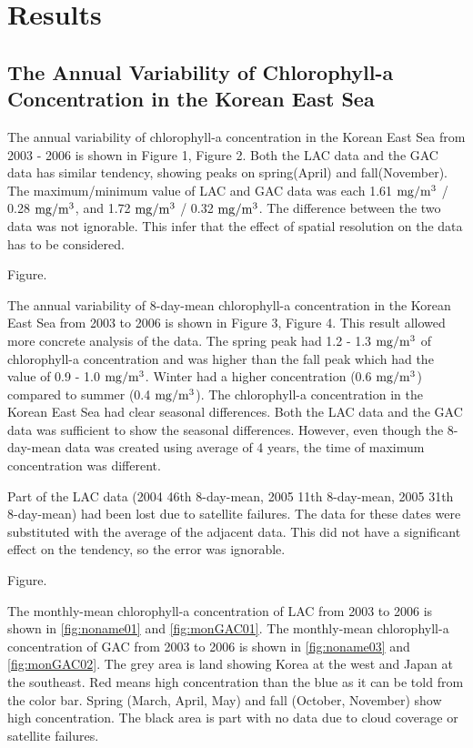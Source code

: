 
\section{Results}
 
\subsection{The Annual Variability of Chlorophyll-a Concentration in the Korean East Sea}
 
The annual variability of chlorophyll-a concentration in the Korean East Sea from 2003 - 2006 is shown in Figure 1, Figure 2. Both the LAC data and the GAC data has similar tendency, showing peaks on spring(April) and fall(November). The maximum/minimum value of LAC and GAC data was each 1.61 $\rm mg/m^3$ / 0.28 $\rm mg/m^3$, and 1.72 $\rm mg/m^3$ / 0.32 $\rm mg/m^3$. The difference between the two data was not ignorable. This infer that the effect of spatial resolution on the data has to be considered.
  
 Figure.
 
The annual variability of 8-day-mean chlorophyll-a concentration in the Korean East Sea from 2003 to 2006 is shown in Figure 3, Figure 4. This result allowed more concrete analysis of the data. The spring peak had 1.2 - 1.3 $\rm mg/m^3$ of chlorophyll-a concentration and was higher than the fall peak which had the value of 0.9 - 1.0 $\rm mg/m^3$. Winter had a higher concentration (0.6 $\rm mg/m^3$) compared to summer (0.4 $\rm mg/m^3$). The chlorophyll-a concentration in the Korean East Sea had clear seasonal differences. Both the LAC data and the GAC data was sufficient to show the seasonal differences. However, even though the 8-day-mean data was created using average of 4 years, the time of maximum concentration was different. 

Part of the LAC data (2004 46th 8-day-mean, 2005 11th 8-day-mean, 2005 31th 8-day-mean) had been lost due to satellite failures. The data for these dates were substituted with the average of the adjacent data. This did not have a significant effect on the tendency, so the error was ignorable.
  
  Figure.
 
The monthly-mean chlorophyll-a concentration of LAC from 2003 to 2006 is shown in \ref{fig:noname01} and \ref{fig:monGAC01}. The monthly-mean chlorophyll-a concentration of GAC from 2003 to 2006 is shown in \ref{fig:noname03} and \ref{fig:monGAC02}. The grey area is land showing Korea at the west and Japan at the southeast. Red means high concentration than the blue as it can be told from the color bar. Spring (March, April, May) and fall (October, November) show high concentration. The black area is part with no data due to cloud coverage or satellite failures. 
    

